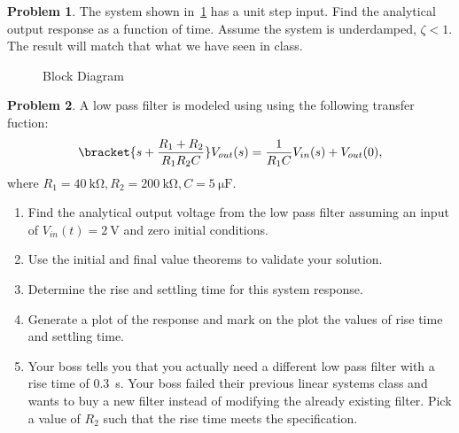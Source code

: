 \documentclass[10pt]{article}
\theoremstyle{definition}
\newtheorem{prob}{Problem}[section]
\newenvironment{subprob}%
{\renewcommand{\theenumi}{\alph{enumi}}\renewcommand{\labelenumi}{(\theenumi)}\begin{enumerate}}%
{\end{enumerate}}%
\begin{document}
\clearpage\newpage
\begin{prob}
    The system shown in~\cref{fig:general_second_order} has a unit step input.
    Find the analytical output response as a function of time.
    Assume the system is underdamped, \( \zeta < 1 \). 
    The result will match that what we have seen in class.
    \begin{figure}[h]
        \centering
            \caption{Block Diagram~\label{fig:general_second_order}}
        \end{figure}
\end{prob}
\begin{prob}
    A low pass filter is modeled using using the following transfer fuction:
    \begin{align}
        \bracket{s + \frac{R_1 + R_2}{R_1 R_2 C}} V_{out}(s) = \frac{1}{R_1 C} V_{in}(s) + V_{out}(0), 
    \end{align}
    where \( R_1 = \SI{40}{\kilo\ohm}, R_2 = \SI{200}{\kilo\ohm}, C = \SI{5}{\micro\farad}\).

    \begin{subprob}
        \item Find the analytical output voltage from the low pass filter assuming an input of \( V_{in}(t) = \SI{2}{\volt}\) and zero initial conditions.
        \item Use the initial and final value theorems to validate your solution.
        \item Determine the rise and settling time for this system response.
        \item Generate a plot of the response and mark on the plot the values of rise time and settling time.
    \item Your boss tells you that you actually need a different low pass filter with a rise time of \SI{0.3}{\second}.
        Your boss failed their previous linear systems class and wants to buy a new filter instead of modifying the already existing filter.
        Pick a value of \( R_2\) such that the rise time meets the specification.
    \end{subprob}
\end{prob}
\end{document}
